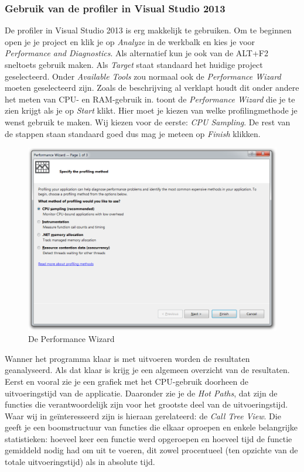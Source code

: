 \subsubsection{Gebruik van de profiler in Visual Studio 2013}

De profiler in Visual Studio 2013 is erg makkelijk te gebruiken.
Om te beginnen open je je project en klik je op \emph{Analyze} in de werkbalk en kies je voor \emph{Performance and Diagnostics}.
Als alternatief kun je ook van de ALT+F2 sneltoets gebruik maken. %
Als \emph{Target} staat standaard het huidige project geselecteerd.
Onder \emph{Available Tools} zou normaal ook de \emph{Performance Wizard} moeten geselecteerd zijn.
Zoals de beschrijving al verklapt houdt dit onder andere het meten van CPU- en RAM-gebruik in.
 toont de \emph{Performance Wizard} die je te zien krijgt als je op \emph{Start} klikt.
Hier moet je kiezen van welke profilingmethode je wenst gebruik te maken.
Wij kiezen voor de eerste: \emph{CPU Sampling}.
De rest van de stappen staan standaard goed dus mag je meteen op \emph{Finish} klikken.

\begin{figure}[]
	\centering
	\includegraphics[scale=0.50]{figures/profiler/performance-wizard}
	\caption{De Performance Wizard}
	\label{performance-wizard}
\end{figure}

Wanner het programma klaar is met uitvoeren worden de resultaten geanalyseerd.
Als dat klaar is krijg je een algemeen overzicht van de resultaten.
Eerst en vooral zie je een grafiek met het CPU-gebruik doorheen de uitvoeringstijd van de applicatie.
Daaronder zie je de \emph{Hot Paths}, dat zijn de functies die verantwoordelijk zijn voor het grootste deel van de uitvoeringstijd.
Waar wij in geïnteresseerd zijn is hieraan gerelateerd: de \emph{Call Tree View}.
Die geeft je een boomstructuur van functies die elkaar oproepen en enkele belangrijke statistieken:
hoeveel keer een functie werd opgeroepen en hoeveel tijd de functie gemiddeld nodig had om uit te voeren,
dit zowel procentueel (ten opzichte van de totale uitvoeringstijd) als in absolute tijd.

